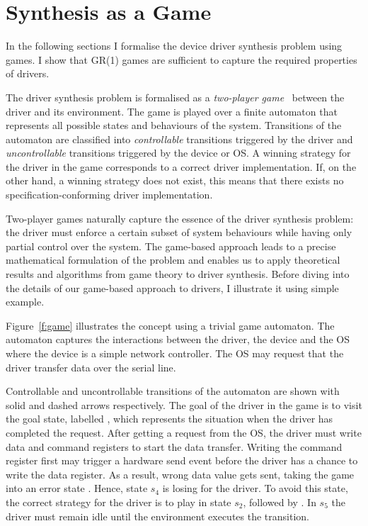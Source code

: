 \chapter{Synthesis as a Game}
\label{ch:game_formalism}

In the following sections I formalise the device driver synthesis problem using games. I show that GR(1) games are sufficient to capture the required properties of drivers.

The driver synthesis problem is formalised as a \emph{two-player game}~\cite{Thomas_95} between the driver and its environment. The game is played over a finite automaton that represents all possible states and behaviours of the system. Transitions of the automaton are classified into \emph{controllable} transitions triggered by the driver and \emph{uncontrollable} transitions triggered by the device or OS. A winning strategy for the driver in the game corresponds to a correct driver implementation. If, on the other hand, a winning strategy does not exist, this means that there exists no specification-conforming driver implementation.

Two-player games naturally capture the essence of the driver synthesis problem: the driver must enforce a certain subset of system behaviours while having only partial control over the system. The game-based approach leads to a precise mathematical formulation of the problem and enables us to apply theoretical results and algorithms from game theory to driver synthesis. Before diving into the details of our game-based approach to drivers, I illustrate it using simple example.

Figure~\ref{f:game} illustrates the concept using a trivial game automaton. The automaton captures the interactions between the driver, the device and the OS where the device is a simple network controller. The OS may request that the driver transfer data over the serial line. 

Controllable and uncontrollable transitions of the automaton are shown with solid and dashed arrows respectively.  The goal of the driver in the game is to visit the goal state, labelled , which represents the situation when the driver has completed the request. After getting a  request from the OS, the driver must write data and command registers to start the data transfer.  Writing the command register first may trigger a hardware send event before the driver has a chance to write the data register.  As a result, wrong data value gets sent, taking the game into an error state .  Hence, state $s_4$ is losing for the driver.  To avoid this state, the correct strategy for the driver is to play  in state $s_2$, followed by .  In $s_5$ the driver must remain idle until the environment executes the  transition.


